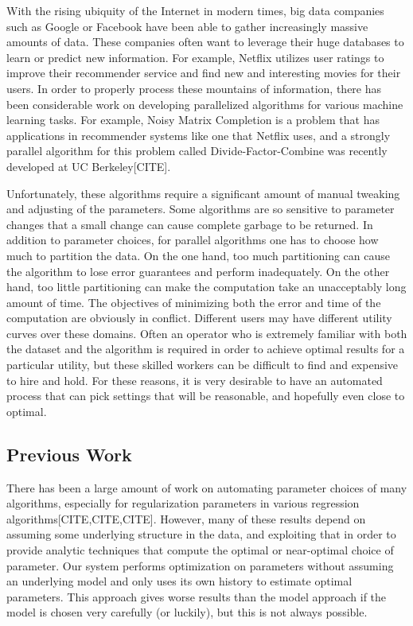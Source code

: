 With the rising ubiquity of the Internet in modern times, big data companies such as Google or Facebook have been able to gather increasingly massive amounts of data. These companies often want to leverage their huge databases to learn or predict new information. For example, Netflix utilizes user ratings to improve their recommender service and find new and interesting movies for their users. In order to properly process these mountains of information, there has been considerable work on developing parallelized algorithms for various machine learning tasks. For example, Noisy Matrix Completion is a problem that has applications in recommender systems like one that Netflix uses, and a strongly parallel algorithm for this problem called Divide-Factor-Combine was recently developed at UC Berkeley[CITE]. 

Unfortunately, these algorithms require a significant amount of manual tweaking and adjusting of the parameters. Some algorithms are so sensitive to parameter changes that a small change can cause complete garbage to be returned. In addition to parameter choices, for parallel algorithms one has to choose how much to partition the data. On the one hand, too much partitioning can cause the algorithm to lose error guarantees and perform inadequately. On the other hand, too little partitioning can make the computation take an unacceptably long amount of time. The objectives of minimizing both the error and time of the computation are obviously in conflict. Different users may have different utility curves over these domains. Often an operator who is extremely familiar with both the dataset and the algorithm is required in order to achieve optimal results for a particular utility, but these skilled workers can be difficult to find and expensive to hire and hold. For these reasons, it is very desirable to have an automated process that can pick settings that will be reasonable, and hopefully even close to optimal. 

\subsection{Previous Work}
There has been a large amount of work on automating parameter choices of many algorithms, especially for regularization parameters in various regression algorithms[CITE,CITE,CITE]. However, many of these results depend on assuming some underlying structure in the data, and exploiting that in order to provide analytic techniques that compute the optimal or near-optimal choice of parameter. Our system performs optimization on parameters without assuming an underlying model and only uses its own history to estimate optimal parameters. This approach gives worse results than the model approach if the model is chosen very carefully (or luckily), but this is not always possible. 

